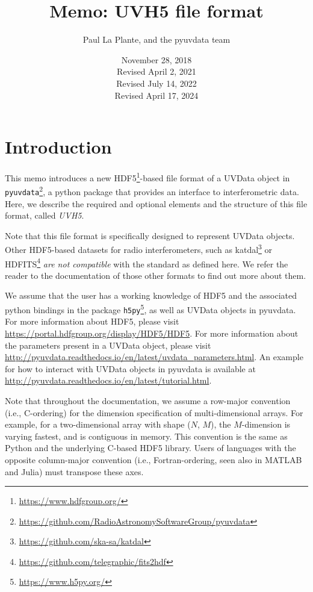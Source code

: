 \documentclass[11pt, oneside]{article}
\title{Memo: UVH5 file format}
\author{Paul La Plante, and the pyuvdata team}
\date{November 28, 2018\\
Revised April 2, 2021\\
Revised July 14, 2022\\
Revised April 17, 2024
}
\begin{document}
\maketitle
\tableofcontents
\section{Introduction}
\label{sec:intro}
This memo introduces a new HDF5\footnote{\url{https://www.hdfgroup.org/}}-based
file format of a UVData object in
\verb+pyuvdata+\footnote{\url{https://github.com/RadioAstronomySoftwareGroup/pyuvdata}}, a python
package that provides an interface to interferometric data. Here, we describe
the required and optional elements and the structure of this file format, called
\textit{UVH5}.

Note that this file format is specifically designed to represent UVData
objects. Other HDF5-based datasets for radio interferometers, such as
katdal\footnote{\url{https://github.com/ska-sa/katdal}} or
HDFITS\footnote{\url{https://github.com/telegraphic/fits2hdf}} \textit{are not
  compatible} with the standard as defined here. We refer the reader to the
documentation of those other formats to find out more about them.

We assume that the user has a working knowledge of HDF5 and the associated
python bindings in the package \verb+h5py+\footnote{\url{https://www.h5py.org/}}, as
well as UVData objects in pyuvdata. For more information about HDF5, please
visit \url{https://portal.hdfgroup.org/display/HDF5/HDF5}. For more information
about the parameters present in a UVData object, please visit
\url{http://pyuvdata.readthedocs.io/en/latest/uvdata_parameters.html}. An
example for how to interact with UVData objects in pyuvdata is available at
\url{http://pyuvdata.readthedocs.io/en/latest/tutorial.html}.

Note that throughout the documentation, we assume a row-major convention (i.e.,
C-ordering) for the dimension specification of multi-dimensional arrays. For
example, for a two-dimensional array with shape ($N$, $M$), the $M$-dimension is
varying fastest, and is contiguous in memory. This convention is the same as
Python and the underlying C-based HDF5 library. Users of languages with the
opposite column-major convention (i.e., Fortran-ordering, seen also in MATLAB
and Julia) must transpose these axes.
\end{document}
